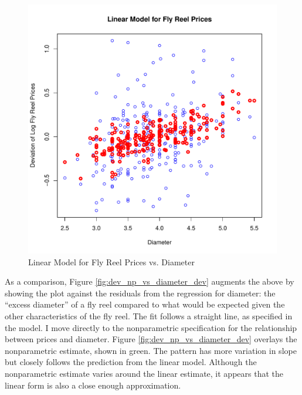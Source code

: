 \begin{figure}[h!]
  \centering
  \includegraphics[scale = 0.5, keepaspectratio=true]{../Figures/dev_vs_diameter}
  \caption{Linear Model for Fly Reel Prices vs. Diameter} \label{fig:dev_vs_diameter}
\end{figure}



\pagebreak
As a comparison, Figure \ref{fig:dev_np_vs_diameter_dev} 
augments the above by showing the plot against the 
residuals from the regression for 
diameter:
the ``excess diameter'' of a fly reel 
compared to what would be 
expected given the other characteristics of the fly reel. 
The fit follows a straight line, as specified in the model. 
% 
I move directly to the nonparametric specification for 
the relationship between prices and 
diameter.
Figure \ref{fig:dev_np_vs_diameter_dev} 
overlays the nonparametric estimate, shown in green. 
The pattern has more variation in slope but 
closely follows the prediction from the linear model. 
Although the nonparametric estimate varies around the linear estimate,
it appears that the linear form
is also a close enough approximation.


